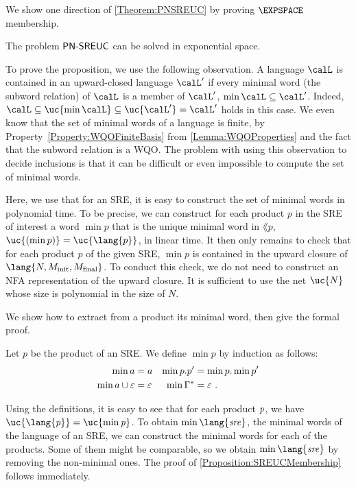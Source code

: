 \documentclass[../../diss.tex]{subfiles}
\begin{document}
We show one direction of \cref{Theorem:PNSREUC} by proving $\EXPSPACE$ membership.

\begin{proposition}%
\label{Proposition:SREUCMembership}%
    The problem $\mathsf{PN\text{-}SREUC}$ can be solved in exponential space.
\end{proposition}

To prove the proposition, we use the following observation.
A language $\calL$ is contained in an upward-closed language $\calL'$ if every minimal word (\wrt the subword relation) of $\calL$ is a member of $\calL'$, \ie $\min \calL \subseteq \calL'$.
Indeed, $\calL \subseteq \uc{\min \calL} \subseteq \uc{  \calL' } = \calL'$ holds in this case.
We even know that the set of minimal words of a language is finite, by Property~\ref{Property:WQOFiniteBasis} from \cref{Lemma:WQOProperties} and the fact that the subword relation is a WQO.\@
The problem with using this observation to decide inclusions is that it can be difficult or even impossible to compute the set of minimal words.

Here, we use that for an SRE, it is easy to construct the set of minimal words in polynomial time.
To be precise, we can construct for each product $p$ in the SRE of interest a word $\min p$ that is the unique minimal word in $\lang{p}$, \ie $\uc{(\min p)} = \uc{\lang{p}}$, in linear time.
It then only remains to check that for each product $p$ of the given SRE, $\min p$ is contained in the upward closure of $\lang{N,M_\init,M_\final}$.
To conduct this check, we do not need to construct an NFA representation of the upward closure.
It is sufficient to use the net $\uc{N}$ whose size is polynomial in the size of $N$.

We show how to extract from a product its minimal word, then give the formal proof.

\begin{definition}
   Let $p$ be the product of an SRE.\@
   We define $\min p$ by induction as follows:
    \begin{align*}
        \min a &= a
        &
        \min p.p' &= \min p . \min p'
        \\
        \min a \cup \varepsilon &= \varepsilon
        &
        \min \Gamma^* &= \varepsilon\ .
    \end{align*}
\end{definition}

Using the definitions, it is easy to see that for each product $\mathit{p}$, we have $\uc{\lang{\product}} = \uc{\min \product}$.
To obtain $\min{\lang{\sre}}$, the minimal words of the language of an SRE, we can construct the minimal words for each of the products.
Some of them might be comparable, so we obtain $\min{\lang{\sre}}$ by removing the non-minimal ones.
The proof of \cref{Proposition:SREUCMembership} follows immediately.
\end{document}
